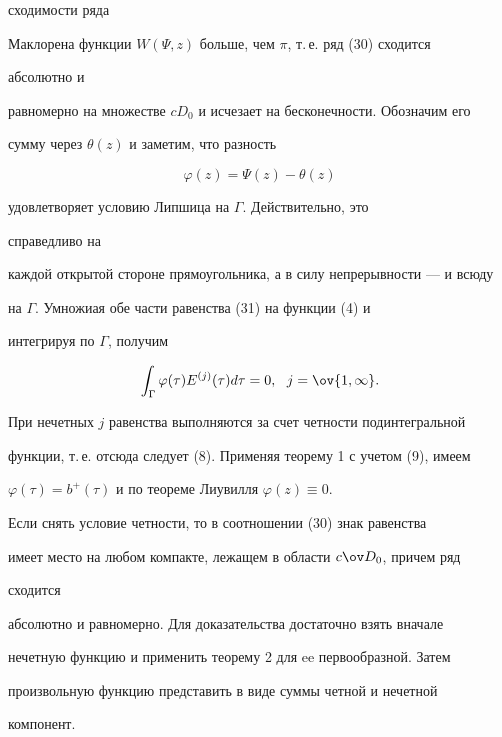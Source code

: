 \begin{pf}
сходимости ряда 


Маклорена функции $W(\Psi,z)$ больше, чем $\pi$, т.\,е. ряд (30) сходится 


абсолютно и 


равномерно на множестве $c D_0$ и исчезает на бесконечности. Обозначим его 


сумму через $\theta(z)$ и заметим, что разность 


\begin{equation} 


\varphi(z)=\Psi(z)-\theta(z) 


\end{equation} 


удовлетворяет условию Липшица на $\Gamma$. Действительно, это 


справедливо на  


каждой открытой стороне прямоугольника, а в силу непрерывности --- и всюду  


на $\Gamma$. Умножиая обе части равенства (31) на функции (4) и 


интегрируя по $\Gamma$, получим


$$ 


\int_\Gamma \varphi(\tau)E^{(j)}(\tau)d\tau=0, 


\ \ j=\ov{1,\infty}. 


$$ 


При нечетных $j$ равенства выполняются за счет четности подинтегральной 


функции, т.\,е. отсюда следует (8). Применяя теорему 1 с учетом (9), имеем  


$\varphi(\tau)=b^+(\tau)$ и по теореме Лиувилля $\varphi(z)\equiv0$. 


\end{pf} 


 


Если снять условие четности, то в соотношении (30) знак равенства  


имеет место на любом компакте, лежащем в области $c\ov D_0$, причем ряд 


сходится 


абсолютно и равномерно. Для доказательства достаточно взять вначале  


нечетную функцию и применить теорему 2 для ee первообразной. Затем  


произвольную функцию представить в виде суммы четной и нечетной  


компонент. 


